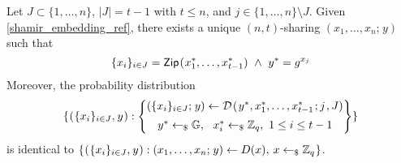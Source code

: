 \documentclass{iacrtrans}
\begin{document}
\begin{lem}\label{shamir_sharing_simulation_lemma}
Let $J \subset \{1, \dots, n\}$, $|J| = t-1$ with $t \le n$,
and $j \in \{1, \dots, n\} \setminus J$.
Given \eqref{shamir_embedding_ref},
there exists a unique $(n, t)$-sharing
$(x_1, \dots, x_n;\hspace{1pt} y)$
such that
\vspace{3pt}
\begin{equation}\label{shamir_sharing_constraint}
\{x_i\}_{i \in J} =
\mathsf{Zip}\hspace{0.75pt}
(\hspace{0.5pt}x_1^*, \dots, x_{t-1}^*)
\ \land
\ y^* = g ^ {x_j}
\vspace{3pt}
\end{equation}
Moreover, the probability distribution
\vspace{5pt}
\begin{equation*}\label{sharing_dist_simulated}
\{\hspace{0.5pt}
(\hspace{0.5pt}\{x_i\}_{i \in J},\hspace{0.5pt} y\hspace{0.5pt}):
\begin{Bmatrix}
(\{x_i\}_{i \in J};\hspace{1pt} y) \leftarrow
\mathcal{D}\hspace{1pt}(
	\hspace{1pt}y^*,
	x_1^*, \dots, x_{t-1}^*
	\hspace{1pt};
	j\hspace{1pt},
	J
)\\[5pt]
y^* \leftarrow_\$ \mathbb{G},
\ \ x_i^* \leftarrow_\$ \mathbb{Z}_q,
\ 1 \le i \le t-1\\[1pt]
\end{Bmatrix}
\}\\[5pt]
\end{equation*}
is identical to
$
\{
\hspace{0.5pt}
(\hspace{0.5pt}\{x_i\}_{i \in J},\hspace{0.5pt} y\hspace{0.5pt}):
(x_1, \dots, x_n;\hspace{1pt} y) \leftarrow D(x),
\hspace{2pt} x \leftarrow_\$ \mathbb{Z}_q
\hspace{0.5pt}
\}
$\hspace{1pt}.
\end{lem}
\end{document}
